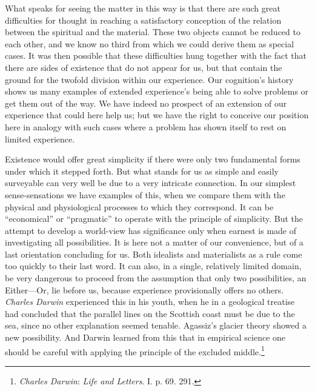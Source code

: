 \documentclass[12pt,a4paper]{book}
\newcommand{\opage}[1]{\marginnote{\footnotesize\textit{[#1]}}}
\begin{document}
What speaks for seeing the matter in this way is that there are such great difficulties for thought in
reaching a satisfactory conception of the relation between the spiritual and the material. These two
objects cannot be reduced to each other, and we know no third from which we could derive them as special
cases. It was then possible that these difficulties hung together with the fact that there are sides of
existence that do not appear for us, but that contain the ground for the twofold division within our
experience. Our cognition's history shows us many examples of extended experience's being able to solve
problems or get them out of the way. We have indeed no prospect of an extension of our experience that
could here help us; but we have the right to conceive our position here in analogy with such cases where a
problem has shown itself to rest on limited experience.

Existence would offer great simplicity if there \opage{337}were only two fundamental forms under which it stepped
forth. But what stands for us as simple and easily surveyable can very well be due to a very intricate
connection. In our simplest sense-sensations we have examples of this, when we compare them with the
physical and physiological processes to which they correspond. It can be ``economical'' or ``pragmatic''
to operate with the principle of simplicity. But the attempt to develop a world-view has significance only
when earnest is made of investigating all possibilities. It is here not a matter of our convenience, but
of a last orientation concluding for us. Both idealists and materialists as a rule come too quickly to
their last word. It can also, in a single, relatively limited domain, be very dangerous to proceed from
the assumption that only two possibilities, an Either---Or, lie before us, because experience provisionally
offers no others. \emph{Charles Darwin} experienced this in his youth, when he in a geological treatise had
concluded that the parallel lines on the Scottish coast must be due to the sea, since no other explanation
seemed tenable. Agassiz's glacier theory showed a new possibility. And Darwin learned from this that in
empirical science one should be careful with applying the principle of the excluded middle.\footnote{\emph{Charles
Darwin}: \emph{Life and Letters}. I. p. 69. 291.}
\end{document}
